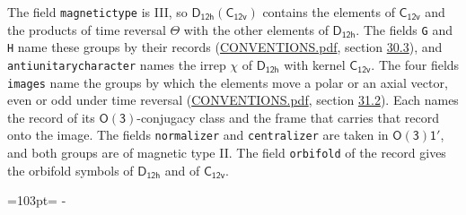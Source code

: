 \documentclass[10pt,a4paper]{article}
\newcommand{\needspace}[1]{\par\penalty-100\begingroup\dimen0=#1\relax\dimen2=\pagegoal
  \advance\dimen2-\pagetotal\ifdim\dimen0>\dimen2\relax\ifdim\dimen2>0pt\vfil\break\fi\fi
  \endgroup}
\numberwithin{equation}{section}
\newcommand{\grp}[1]{\mathsf{#1}}
\begin{document}
The field \texttt{magnetictype} is III, so $\grp{D_{12h}}(\grp{C_{12v}})$ contains the elements of $\grp{C_{12v}}$ and the products of time reversal $\varTheta$ with the other elements of $\grp{D_{12h}}$. The fields \texttt{G} and \texttt{H} name these groups by their records (\href{../../CONVENTIONS.pdf}{CONVENTIONS.pdf}, section \href{../../CONVENTIONS.pdf\#conv.30.3}{30.3}), and \texttt{antiunitarycharacter} names the irrep $\chi$ of $\grp{D_{12h}}$ with kernel $\grp{C_{12v}}$. The four fields \texttt{images} name the groups by which the elements move a polar or an axial vector, even or odd under time reversal (\href{../../CONVENTIONS.pdf}{CONVENTIONS.pdf}, section \href{../../CONVENTIONS.pdf\#conv.31.2}{31.2}). Each names the record of its $\grp{O(3)}$-conjugacy class and the frame that carries that record onto the image. The fields \texttt{normalizer} and \texttt{centralizer} are taken in $\grp{O(3)1'}$, and both groups are of magnetic type II. The field \texttt{orbifold} of the record gives the orbifold symbols of $\grp{D_{12h}}$ and of $\grp{C_{12v}}$.
\needspace{103pt}
\end{document}
